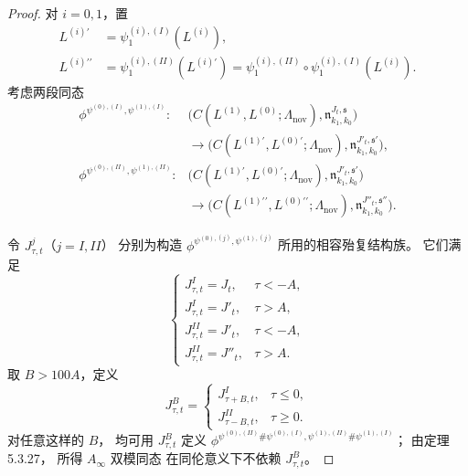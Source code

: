 \begin{proof}
对 $i=0,1$，置
\[
\begin{aligned}
L^{(i)\prime}
&=\psi^{(i),(I)}_1(L^{(i)}),\\
L^{(i)\prime\prime}
&=\psi^{(i),(II)}_1(L^{(i)\prime})
=\psi^{(i),(II)}_1
\circ\psi^{(i),(I)}_1(L^{(i)}).
\end{aligned}
\]
考虑两段同态
\[
\begin{aligned}
\phi^{\psi^{(0),(I)},\psi^{(1),(I)}}\colon&
\bigl(
C(L^{(1)},L^{(0)};
\Lambda_{\mathrm{nov}}),
\mathfrak n^{J_t,\mathfrak s}_{k_1,k_0}
\bigr)\\
&\longrightarrow
\bigl(
C(L^{(1)\prime},L^{(0)\prime};
\Lambda_{\mathrm{nov}}),
\mathfrak n^{J'_t,\mathfrak s'}_{k_1,k_0}
\bigr),\\[1mm]
\phi^{\psi^{(0),(II)},\psi^{(1),(II)}}\colon&
\bigl(
C(L^{(1)\prime},L^{(0)\prime};
\Lambda_{\mathrm{nov}}),
\mathfrak n^{J'_t,\mathfrak s'}_{k_1,k_0}
\bigr)\\
&\longrightarrow
\bigl(
C(L^{(1)\prime\prime},L^{(0)\prime\prime};
\Lambda_{\mathrm{nov}}),
\mathfrak n^{J''_t,\mathfrak s''}_{k_1,k_0}
\bigr).
\end{aligned}
\]

令 $J^j_{\tau,t}$（$j=I,II$）
分别为构造
$\phi^{\psi^{(0),(j)},\psi^{(1),(j)}}$
所用的相容殆复结构族。
它们满足
\[
\begin{cases}
J^I_{\tau,t}=J_t,
&\tau<-A,\\
J^I_{\tau,t}=J'_t,
&\tau>A,\\
J^{II}_{\tau,t}=J'_t,
&\tau<-A,\\
J^{II}_{\tau,t}=J''_t,
&\tau>A.
\end{cases}
\]
取 $B>100A$，定义
\[
J^B_{\tau,t}
=
\begin{cases}
J^I_{\tau+B,t},&\tau\le0,\\
J^{II}_{\tau-B,t},&\tau\ge0.
\end{cases}
\]
对任意这样的 $B$，
均可用 $J^B_{\tau,t}$
定义
$\phi^{
\psi^{(0),(II)}\#\psi^{(0),(I)},
\psi^{(1),(II)}\#\psi^{(1),(I)}}$；
由定理 5.3.27，
所得 $A_\infty$ 双模同态
在同伦意义下不依赖 $J^B_{\tau,t}$。


\end{proof}
